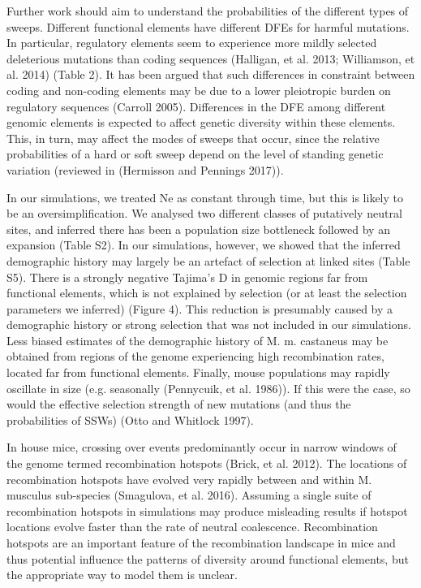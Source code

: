 	Further work should aim to understand the probabilities of the different types of sweeps. Different functional elements have different DFEs for harmful mutations. In particular, regulatory elements seem to experience more mildly selected deleterious mutations than coding sequences (Halligan, et al. 2013; Williamson, et al. 2014) (Table 2). It has been argued that such differences in constraint between coding and non-coding elements may be due to a lower pleiotropic burden on regulatory sequences (Carroll 2005). Differences in the DFE among different genomic elements is expected to affect genetic diversity within these elements. This, in turn, may affect the modes of sweeps that occur, since the relative probabilities of a hard or soft sweep depend on the level of standing genetic variation (reviewed in (Hermisson and Pennings 2017)). 

	In our simulations, we treated Ne as constant through time, but this is likely to be an oversimplification. We analysed two different classes of putatively neutral sites, and inferred there has been a population size bottleneck followed by an expansion (Table S2). In our simulations, however, we showed that the inferred demographic history may largely be an artefact of selection at linked sites (Table S5). There is a strongly negative Tajima’s D in genomic regions far from functional elements, which is not explained by selection (or at least the selection parameters we inferred) (Figure 4). This reduction is presumably caused by a demographic history or strong selection that was not included in our simulations. Less biased estimates of the demographic history of M. m. castaneus may be obtained from regions of the genome experiencing high recombination rates, located far from functional elements. Finally, mouse populations may rapidly oscillate in size (e.g. seasonally (Pennycuik, et al. 1986)). If this were the case, so would the effective selection strength of new mutations (and thus the probabilities of SSWs) (Otto and Whitlock 1997). 

In house mice, crossing over events predominantly occur in narrow windows of the genome termed recombination hotspots (Brick, et al. 2012). The locations of recombination hotspots have evolved very rapidly between and within M. musculus sub-species (Smagulova, et al. 2016). Assuming a single suite of recombination hotspots in simulations may produce misleading results if hotspot locations evolve faster than the rate of neutral coalescence. Recombination hotspots are an important feature of the recombination landscape in mice and thus potential influence the patterns of diversity around functional elements, but the appropriate way to model them is unclear.

